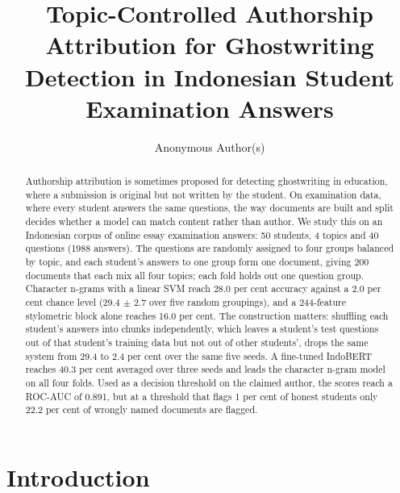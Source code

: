 \documentclass[runningheads]{llncs}
\begin{document}
\title{Topic-Controlled Authorship Attribution for Ghostwriting Detection in Indonesian Student Examination Answers}


\author{Anonymous Author(s)}



\maketitle

\begin{abstract}
Authorship attribution is sometimes proposed for detecting ghostwriting in education, where a submission is original but not written by the student. On examination data, where every student answers the same questions, the way documents are built and split decides whether a model can match content rather than author. We study this on an Indonesian corpus of online essay examination answers: 50 students, 4 topics and 40 questions (1988 answers). The questions are randomly assigned to four groups balanced by topic, and each student's answers to one group form one document, giving 200 documents that each mix all four topics; each fold holds out one question group. Character n-grams with a linear SVM reach 28.0 per cent accuracy against a 2.0 per cent chance level (29.4 $\pm$ 2.7 over five random groupings), and a 244-feature stylometric block alone reaches 16.0 per cent. The construction matters: shuffling each student's answers into chunks independently, which leaves a student's test questions out of that student's training data but not out of other students', drops the same system from 29.4 to 2.4 per cent over the same five seeds. A fine-tuned IndoBERT reaches 40.3 per cent averaged over three seeds and leads the character n-gram model on all four folds. Used as a decision threshold on the claimed author, the scores reach a ROC-AUC of 0.891, but at a threshold that flags 1 per cent of honest students only 22.2 per cent of wrongly named documents are flagged.

\end{abstract}

\section{Introduction}
\end{document}

